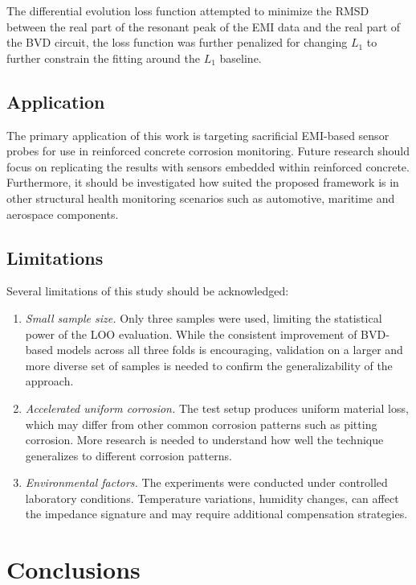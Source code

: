 \documentclass[journal,twoside,web]{ieeecolor}
\begin{document}
The differential evolution loss function attempted to minimize the RMSD between the real part of the resonant peak of the EMI data and the real part of the BVD circuit, the loss function was further penalized for changing $L_1$ to further constrain the fitting around the $L_1$ baseline.

\subsection{Application}

The primary application of this work is targeting sacrificial EMI-based sensor probes for use in reinforced concrete corrosion monitoring. Future research should focus on replicating the results with sensors embedded within reinforced concrete. Furthermore, it should be investigated how suited the proposed framework is in other structural health monitoring scenarios such as automotive, maritime and aerospace components.

\subsection{Limitations}

Several limitations of this study should be acknowledged:

\begin{enumerate} 
    \item \textit{Small sample size.} Only three samples were used, limiting the statistical power of the LOO evaluation. While the consistent improvement of BVD-based models across all three folds is encouraging, validation on a larger and more diverse set of samples is needed to confirm the generalizability of the approach. 
    \item \textit{Accelerated uniform corrosion.} The test setup produces uniform material loss, which may differ from other common corrosion patterns such as pitting corrosion. More research is needed to understand how well the technique generalizes to different corrosion patterns. 
    \item \textit{Environmental factors.} The experiments were conducted under controlled laboratory conditions. Temperature variations, humidity changes, can affect the impedance signature and may require additional compensation strategies. \end{enumerate}

\section{Conclusions}\label{sec5}
\end{document}
